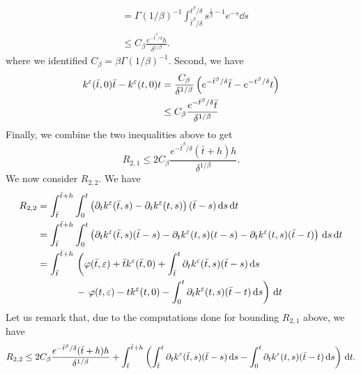 \documentclass[10pt]{article}
\begin{document}
\begin{appendices}
\begin{equation}
\begin{aligned}
	&= \Gamma(1/\beta)^{-1} \int_{\bar t^\beta/\delta}^{t^\beta / \delta} s^{\frac1\beta - 1}e^{-s} \dd s\\
	&\leq  C_\beta \frac{e^{-\bar t^\beta / \delta} h}{\delta^{1/\beta}}.
\end{aligned}
\end{equation}
where we identified $C_\beta=\beta \Gamma(1/\beta)^{-1}$. Second, we have
\begin{equation}
\begin{aligned}
	k^\varepsilon(\bar t, 0) \bar t - k^\varepsilon(t, 0) t &= \frac{C_\beta}{\delta^{1/\beta}} \left(e^{-\bar t^\beta/\delta} \bar t - e^{-t^\beta / \delta} t\right) \\
	&\leq C_\beta\frac{e^{-\bar t^\beta / \delta}\bar t}{\delta^{1/\beta}}
\end{aligned}
\end{equation}
Finally, we combine the two inequalities above to get
\begin{equation}\label{eq:AppendixLemma_BoundR21}
	R_{2,1} \leq 2 C_\beta \frac{e^{-\bar t^\beta / \delta} (\bar t + h)h}{\delta^{1/\beta}}.
\end{equation}
We now consider $R_{2,2}$. We have
\begin{equation}
\begin{aligned}
	R_{2,2} &= \int_{\bar t}^{\bar t + h}\int_0^t \left(\partial_t k^\varepsilon(\bar t, s) - \partial_t k^\varepsilon(t, s)\right)(\bar t - s)  \,\mathrm{d} s \,\mathrm{d} t \\
	&= \int_{\bar t}^{\bar t + h}\int_0^t \left(\partial_t k^\varepsilon(\bar t, s)(\bar t - s) - \partial_t k^\varepsilon(t, s)(t-s) - \partial_t k^\varepsilon(t, s)(\bar t - t)\right)\,\mathrm{d} s \,\mathrm{d} t \\
	&= \int_{\bar t}^{\bar t + h} 
	\begin{aligned}[t]
	&\left(\varphi(\bar t, \varepsilon) + \bar t k^\varepsilon(\bar t, 0) + \int_{\bar t}^{t}\partial_t k^\varepsilon(\bar t, s)(\bar t - s) \,\mathrm{d} s \right.\\
	&- \left. \varphi(t, \varepsilon) - t k^\varepsilon(t, 0) - \int_0^t \partial_t k^\varepsilon(t, s)(\bar t - t) \,\mathrm{d} s \right) \,\mathrm{d} t
	\end{aligned}
\end{aligned}
\end{equation}
Let us remark that, due to the computations done for bounding $R_{2,1}$ above, we have
\begin{equation}
\begin{aligned}
	R_{2,2} \leq 2 C_\beta \frac{e^{-\bar t^\beta / \delta} (\bar t + h)h}{\delta^{1/\beta}} + \int_{\bar t}^{\bar t + h}\left(\int_{\bar t}^{t}\partial_t k^\epl(\bar t, s)(\bar t - s) \dd s -  \int_0^t \partial_t k^\epl(t, s)(\bar t - t) \dd s \right) \dd t.

\end{aligned}
\end{equation}
\end{appendices}
\end{document}
